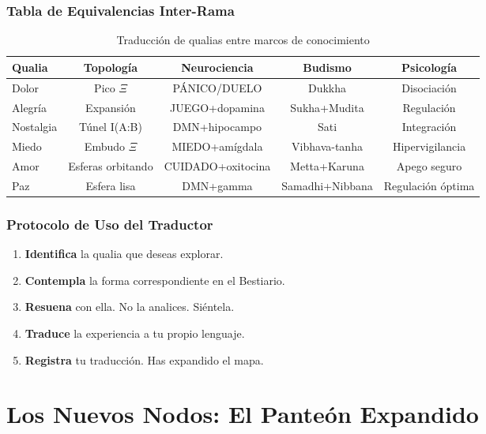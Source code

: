 \documentclass[12pt,openany]{book}
\begin{document}
\section{Tabla de Equivalencias Inter-Rama}

\begin{table}[h!]
\centering
\caption{Traducción de qualias entre marcos de conocimiento}
\begin{tabular}{lcccc}
\toprule
\textbf{Qualia} & \textbf{Topología} & \textbf{Neurociencia} & \textbf{Budismo} & \textbf{Psicología} \\
\midrule
Dolor & Pico $\Xi$ & PÁNICO/DUELO & Dukkha & Disociación \\
Alegría & Expansión & JUEGO+dopamina & Sukha+Mudita & Regulación \\
Nostalgia & Túnel I(A:B) & DMN+hipocampo & Sati & Integración \\
Miedo & Embudo $\Xi$ & MIEDO+amígdala & Vibhava-tanha & Hipervigilancia \\
Amor & Esferas orbitando & CUIDADO+oxitocina & Metta+Karuna & Apego seguro \\
Paz & Esfera lisa & DMN+gamma & Samadhi+Nibbana & Regulación óptima \\
\bottomrule
\end{tabular}
\end{table}

\section{Protocolo de Uso del Traductor}

\begin{enumerate}
  \item \textbf{Identifica} la qualia que deseas explorar.
  \item \textbf{Contempla} la forma correspondiente en el Bestiario.
  \item \textbf{Resuena} con ella. No la analices. Siéntela.
  \item \textbf{Traduce} la experiencia a tu propio lenguaje.
  \item \textbf{Registra} tu traducción. Has expandido el mapa.
\end{enumerate}

\part{Los Nuevos Nodos: El Panteón Expandido}
\end{document}
